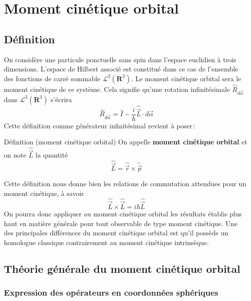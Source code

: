 \section{Moment cinétique orbital}

    \subsection{Définition}

        On considère une particule ponctuelle sans spin dans l’espace euclidien à trois dimensions. L’espace de Hilbert associé est constitué dans ce cas de l’ensemble des fonctions de carré sommable $\mathcal{L}^2(\mathbf{R}^3)$. Le moment cinétique orbital sera le moment cinétique de ce système. Cela signifie qu’une rotation infinitésimale $\hat{R}_{d\vec{\alpha}}$ dans $\mathcal{L}^2(\mathbf{R}^3)$ s’écrira 
        \[ \hat{R}_{d\vec{\alpha}} = \hat{I} - \frac{i}{\hbar} \hat{\vec{L}} \cdot d\vec{\alpha} \] 
        Cette définition comme générateur infinitésimal revient à poser :

        \begin{omed}{Définition (moment cinétique orbital)}
            On appelle \textbf{moment cinétique orbital} et on note $\hat{\vec{L}}$ la quantité 
            \[ \hat{\vec{L}} = \hat{\vec{r}} \times \hat{\vec{p}} \]
        \end{omed}

        Cette définition nous donne bien les relations de commutation attendues pour un moment cinétique, à savoir 
        \[ \hat{\vec{L}} \times \hat{\vec{L}} = i \hbar \hat{\vec{L}} \]   
        On pourra donc appliquer au moment cinétique orbital les résultats établis plus haut en matière générale pour tout observable de type moment cinétique. Une des principales différences du moment cinétique orbital est qu’il possède un homologue classique contrairement au moment cinétique intrinsèque.

    \subsection{Théorie générale du moment cinétique orbital}

        \subsubsection{Expression des opérateurs en coordonnées sphériques}


